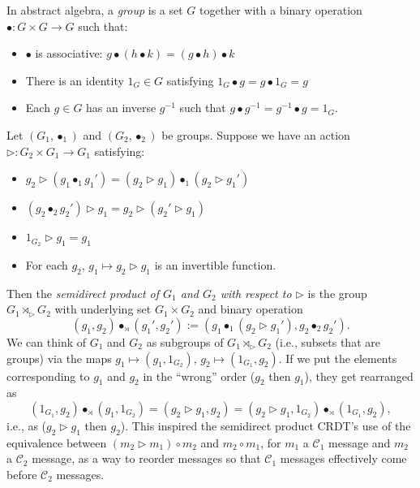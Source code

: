 \documentclass[acmsmall,nonacm,12pt]{acmart}
\newcommand{\mc}[1]{\ensuremath{\mathcal{#1}}}
\newcommand{\ra}{\rightarrow}
\newcommand{\act}{\triangleright}
\theoremstyle{plain}
\theoremstyle{definition}
\newtheorem{myrmk}[mythm]{Remark}
\begin{document}
In abstract algebra, a \textit{group} is a set $G$ together with a binary operation $\bullet: G \times G \ra G$ such that:
\begin{itemize}
  \renewcommand\labelitemi{--}
  \item $\bullet$ is associative: $g \bullet (h \bullet k) = (g \bullet h) \bullet k$
  \item There is an identity $1_G \in G$ satisfying $1_G \bullet g = g \bullet 1_G = g$
  \item Each $g \in G$ has an inverse $g^{-1}$ such that $g \bullet g^{-1} = g^{-1} \bullet g = 1_G$.
\end{itemize}
Let $(G_1, \bullet_1)$ and $(G_2, \bullet_2)$ be groups.  Suppose we have an action $\act: G_2 \times G_1 \ra G_1$ satisfying:
\begin{itemize}
  \renewcommand\labelitemi{--}
  \item $g_2 \act (g_1 \bullet_1 g_1') = (g_2 \act g_1) \bullet_1 (g_2 \act g_1')$
  \item $(g_2 \bullet_2 g_2') \act g_1 = g_2 \act (g_2' \act g_1)$
  \item $1_{G_2} \act g_1 = g_1$
  \item For each $g_2$, $g_1 \mapsto g_2 \act g_1$ is an invertible function.
\end{itemize}
Then the \textit{semidirect product of $G_1$ and $G_2$ with respect to $\act$} is the group $G_1 \rtimes_\act G_2$ with underlying set $G_1 \times G_2$ and binary operation \cite[\S 5.5]{dummit_foote}
\[
(g_1, g_2) \bullet_\rtimes (g_1', g_2') := (g_1 \bullet_1 (g_2 \act g_1'), g_2 \bullet_2 g_2').
\]
We can think of $G_1$ and $G_2$ as subgroups of $G_1 \rtimes_\act G_2$ (i.e., subsets that are groups) via the maps $g_1 \mapsto (g_1, 1_{G_2})$, $g_2 \mapsto (1_{G_1}, g_2)$.  If we put the elements corresponding to $g_1$ and $g_2$ in the ``wrong'' order ($g_2$ then $g_1$), they get rearranged as
\[
(1_{G_1}, g_2) \bullet_\rtimes (g_1, 1_{G_2}) = (g_2 \act g_1, g_2) = (g_2 \act g_1, 1_{G_2}) \bullet_\rtimes (1_{G_1}, g_2),
\]
i.e., as ($g_2 \act g_1$ then $g_2$).  This inspired the semidirect product CRDT's use of the equivalence between $(m_2 \act m_1) \circ m_2$ and $m_2 \circ m_1$, for $m_1$ a $\mc{C}_1$ message and $m_2$ a $\mc{C}_2$ message, as a way to reorder messages so that $\mc{C}_1$ messages effectively come before $\mc{C}_2$ messages.

\end{document}
